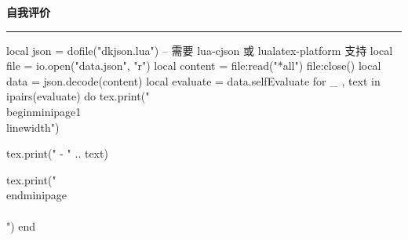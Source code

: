 \documentclass[10pt, a4paper, oneside]{ctexart}
\begin{document}
\ifdefined\selfEvaluate
\begin{minipage}{1\textwidth}
    \large{\textbf{自我评价}}
\end{minipage}
\rule{\linewidth}{\lineSize}
\begin{center}
    \begin{minipage}{0.9\textwidth}
        \begin{luacode}
            local json = dofile("dkjson.lua")  -- 需要 lua-cjson 或 lualatex-platform 支持
            local file = io.open("data.json", "r")
            local content = file:read("*all")
            file:close()
            local data = json.decode(content)
            local evaluate = data.selfEvaluate
            for _ , text in ipairs(evaluate) do
                tex.print("\\begin{minipage}{1\\linewidth}")

                tex.print(" - " .. text)

                tex.print("\\end{minipage}\\\\[0.5em]")
            end
        \end{luacode}
    \end{minipage}
\end{center}
\fi
\end{document}
